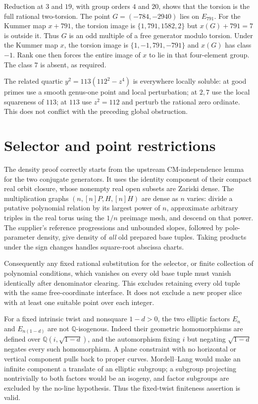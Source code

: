 \documentclass[11pt,a4paper]{article}
\newcommand{\Q}{\mathbb Q}\newcommand{\Z}{\mathbb Z}
\begin{document}
Reduction at $3$ and $19$, with group orders $4$ and $20$, shows that
the torsion is the full rational two-torsion. The point
$G=(-784,-2940)$ lies on $E_{791}$. For the Kummer map $x+791$, the
torsion image is $\{1,791,1582,2\}$ but $x(G)+791=7$ is outside it.
Thus $G$ is an odd multiple of a free generator modulo torsion. Under
the Kummer map $x$, the torsion image is
$\{1,-1,791,-791\}$ and $x(G)$ has class $-1$. Rank one then forces
the entire image of $x$ to lie in that four-element group. The class $7$
is absent, as required.

The related quartic $y^2=113(112^2-z^4)$ is everywhere locally soluble:
at good primes use a smooth genus-one point and local perturbation;
at $2,7$ use the local squareness of $113$; at $113$ use
$z^2=112$ and perturb the rational zero ordinate. This does not conflict
with the preceding global obstruction.

\section{Selector and point restrictions}
The density proof correctly starts from the upstream CM-independence
lemma for the two conjugate generators. It uses the identity component
of their compact real orbit closure, whose nonempty real open subsets
are Zariski dense. The multiplication graphs
$(n,[n]P,H,[n]H)$ are dense as $n$ varies: divide a putative polynomial
relation by its largest power of $n$, approximate arbitrary triples in
the real torus using the $1/n$ preimage mesh, and descend on that power.
The supplier's reference progressions and unbounded slopes, followed by
pole-parameter density, give density of \emph{all} old prepared base
tuples. Taking products under the sign changes handles square-root
abscissa charts.

Consequently any fixed rational substitution for the selector, or finite
collection of polynomial conditions, which vanishes on every old base
tuple must vanish identically after denominator clearing. This excludes
retaining every old tuple with the same free-coordinate interface. It
does not exclude a new proper slice with at least one suitable point
over each integer.

For a fixed intrinsic twist and nonsquare $1-d>0$, the two elliptic
factors $E_n$ and $E_{n(1-d)}$ are not $\Q$-isogenous. Indeed their
geometric homomorphisms are defined over
$\Q(i,\sqrt{1-d})$, and the automorphism fixing $i$ but negating
$\sqrt{1-d}$ negates every such homomorphism. A plane constraint with
no horizontal or vertical component pulls back to proper curves.
Mordell--Lang would make an infinite component a translate of an
elliptic subgroup; a subgroup projecting nontrivially to both factors
would be an isogeny, and factor subgroups are excluded by the no-line
hypothesis. Thus the fixed-twist finiteness assertion is valid.
\end{document}
